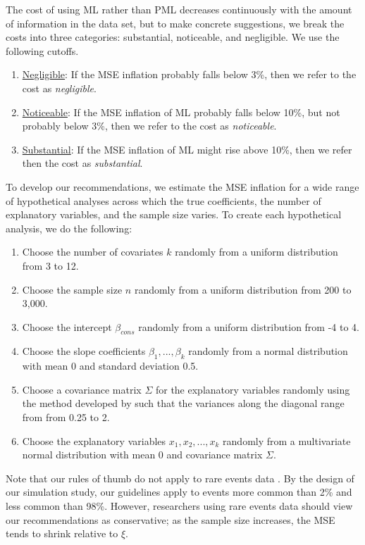 \documentclass[12pt]{article}
\begin{document}
The cost of using ML rather than PML decreases continuously with the amount of information in the data set, but to make concrete suggestions, we break the costs into three categories: substantial, noticeable, and negligible.
We use the following cutoffs.
\begin{enumerate}
\item \underline{Negligible}: If the MSE inflation probably falls below 3\%, then we refer to the cost as \textit{negligible}.
\item \underline{Noticeable}: If the MSE inflation of ML probably falls below 10\%, but not probably below 3\%, then we refer to the cost as \textit{noticeable}.
\item \underline{Substantial}: If the MSE inflation of ML might rise above 10\%, then we refer then the cost as \textit{substantial}.
\end{enumerate}

To develop our recommendations, we estimate the MSE inflation for a wide range of hypothetical analyses across which the true coefficients, the number of explanatory variables, and the sample size varies. 
To create each hypothetical analysis, we do the following:
\begin{enumerate}
\item Choose the number of covariates $k$ randomly from a uniform distribution from 3 to 12.
\item Choose the sample size $n$ randomly from a uniform distribution from 200 to 3,000.
\item Choose the intercept $\beta_{cons}$ randomly from a uniform distribution from -4 to 4.
\item Choose the slope coefficients $\beta_1,...,\beta_k$ randomly from a normal distribution with mean 0 and standard deviation 0.5.
\item Choose a covariance matrix $\Sigma$ for the explanatory variables randomly using the method developed by \cite{Joe2006} such that the variances along the diagonal range from from 0.25 to 2.
\item Choose the explanatory variables $x_1, x_2,...,x_k$ randomly from a multivariate normal distribution with mean 0 and covariance matrix $\Sigma$. 
\end{enumerate}
Note that our rules of thumb do not apply to rare events data \citep{KingZeng2001}.
By the design of our simulation study, our guidelines apply to events more common than 2\% and less common than 98\%.
However, researchers using rare events data should view our recommendations as conservative; as the sample size increases, the MSE tends to shrink relative to $\xi$. 
\end{document}
